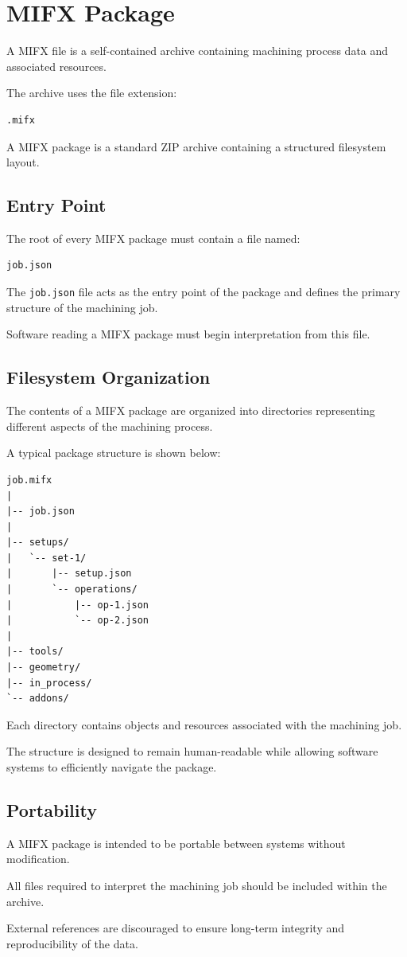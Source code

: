 \section{MIFX Package}

A MIFX file is a self-contained archive containing machining process data and associated resources.

The archive uses the file extension:

\begin{verbatim}
.mifx
\end{verbatim}

A MIFX package is a standard ZIP archive containing a structured filesystem layout.

\subsection{Entry Point}

The root of every MIFX package must contain a file named:

\begin{verbatim}
job.json
\end{verbatim}

The \texttt{job.json} file acts as the entry point of the package and defines the primary structure of the machining job.

Software reading a MIFX package must begin interpretation from this file.

\subsection{Filesystem Organization}

The contents of a MIFX package are organized into directories representing different aspects of the machining process.

A typical package structure is shown below:

\begin{verbatim}
job.mifx
|
|-- job.json
|
|-- setups/
|   `-- set-1/
|       |-- setup.json
|       `-- operations/
|           |-- op-1.json
|           `-- op-2.json
|
|-- tools/
|-- geometry/
|-- in_process/
`-- addons/
\end{verbatim}

Each directory contains objects and resources associated with the machining job.

The structure is designed to remain human-readable while allowing software systems to efficiently navigate the package.

\subsection{Portability}

A MIFX package is intended to be portable between systems without modification.

All files required to interpret the machining job should be included within the archive.

External references are discouraged to ensure long-term integrity and reproducibility of the data.